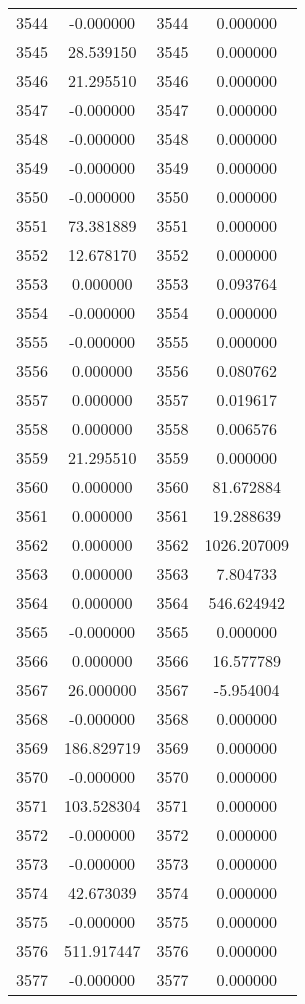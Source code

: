\documentclass[12pt]{article}
\begin{document}
\begin{longtable}{@{}cccc@{}}
3544 & -0.000000 & 3544 & 0.000000 \\
3545 & 28.539150 & 3545 & 0.000000 \\
3546 & 21.295510 & 3546 & 0.000000 \\
3547 & -0.000000 & 3547 & 0.000000 \\
3548 & -0.000000 & 3548 & 0.000000 \\
3549 & -0.000000 & 3549 & 0.000000 \\
3550 & -0.000000 & 3550 & 0.000000 \\
3551 & 73.381889 & 3551 & 0.000000 \\
3552 & 12.678170 & 3552 & 0.000000 \\
3553 & 0.000000 & 3553 & 0.093764 \\
3554 & -0.000000 & 3554 & 0.000000 \\
3555 & -0.000000 & 3555 & 0.000000 \\
3556 & 0.000000 & 3556 & 0.080762 \\
3557 & 0.000000 & 3557 & 0.019617 \\
3558 & 0.000000 & 3558 & 0.006576 \\
3559 & 21.295510 & 3559 & 0.000000 \\
3560 & 0.000000 & 3560 & 81.672884 \\
3561 & 0.000000 & 3561 & 19.288639 \\
3562 & 0.000000 & 3562 & 1026.207009 \\
3563 & 0.000000 & 3563 & 7.804733 \\
3564 & 0.000000 & 3564 & 546.624942 \\
3565 & -0.000000 & 3565 & 0.000000 \\
3566 & 0.000000 & 3566 & 16.577789 \\
3567 & 26.000000 & 3567 & -5.954004 \\
3568 & -0.000000 & 3568 & 0.000000 \\
3569 & 186.829719 & 3569 & 0.000000 \\
3570 & -0.000000 & 3570 & 0.000000 \\
3571 & 103.528304 & 3571 & 0.000000 \\
3572 & -0.000000 & 3572 & 0.000000 \\
3573 & -0.000000 & 3573 & 0.000000 \\
3574 & 42.673039 & 3574 & 0.000000 \\
3575 & -0.000000 & 3575 & 0.000000 \\
3576 & 511.917447 & 3576 & 0.000000 \\
3577 & -0.000000 & 3577 & 0.000000 \\

\end{longtable}
\end{document}
